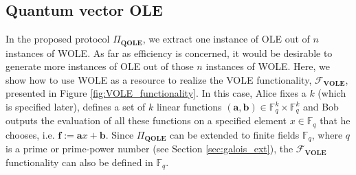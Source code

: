 \subsection{Quantum vector OLE}
\label{sec:qvole}
In the proposed protocol $\Pi_{\textbf{QOLE}}$, we extract one instance of OLE out of $n$ instances of WOLE. As far as efficiency is concerned, it would be desirable to generate more instances of OLE out of those $n$ instances of WOLE. Here, we show how to use WOLE as a resource to realize the VOLE functionality, $\mathcal{F}_{\textbf{VOLE}}$, presented in Figure \ref{fig:VOLE_functionality}. In this case, Alice  fixes a $k$ (which is specified later), defines a set of $k$ linear functions $(\bm{a}, \bm{b})\in\mathbb{F}^k_q\times\mathbb{F}^k_q$ and Bob outputs the evaluation of all these functions on a specified element $x\in\mathbb{F}_q$ that he chooses, i.e. $\bm{f}:=\bm{a} x+ \bm{b}$. Since  $\Pi_{\textbf{QOLE}}$ can be extended to finite fields $\mathbb{F}_q$, where $q$ is a prime or prime-power number (see Section \ref{sec:galois_ext}), the $\mathcal{F}_{\textbf{VOLE}}$ functionality can also be defined in $\mathbb{F}_q$. 

